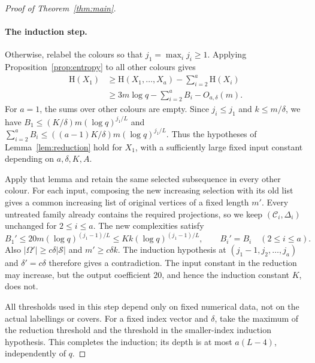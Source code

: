 \documentclass[11pt,a4paper]{article}
\numberwithin{equation}{section}
\newcommand{\HH}{\mathrm H}
\newcommand{\cC}{\mathcal C}
\newcommand{\cS}{\mathcal S}
\begin{document}
\begin{proof}[Proof of Theorem~\ref{thm:main}]
\paragraph{The induction step.}
Otherwise, relabel the colours so that
$j_1=\max_i j_i\ge1$.
Applying Proposition~\ref{prop:entropy} to all other colours
gives
\begin{equation}\label{eq:marginal}
 \begin{aligned}
 \HH(X_1)
 &\ge\HH(X_1,\ldots,X_a)-\sum_{i=2}^a\HH(X_i)\\
 &\ge3m\log q-\sum_{i=2}^aB_i-O_{a,\delta}(m).
 \end{aligned}
\end{equation}
For $a=1$, the sums over other colours are empty.
Since $j_i\le j_1$ and $k\le m/\delta$, we have
$B_1\le(K/\delta)m(\log q)^{j_1/L}$ and
$\sum_{i=2}^aB_i\le((a-1)K/\delta)m(\log q)^{j_1/L}$.
Thus the hypotheses of Lemma~\ref{lem:reduction} hold for
$X_1$, with a sufficiently large fixed input constant depending
on $a,\delta,K,A$.

Apply that lemma and retain the same selected subsequence in
every other colour.
For each input, composing the new increasing selection with
its old list gives a common increasing list of original
vertices of a fixed length $m'$.
Every untreated family already contains the required projections,
so we keep $(\cC_i,\Delta_i)$ unchanged for $2\le i\le a$.
The new complexities satisfy
\begin{equation}\label{eq:descent}
 B_1'\le20m(\log q)^{(j_1-1)/L}
       \le Kk(\log q)^{(j_1-1)/L},\qquad
 B_i'=B_i\quad(2\le i\le a).
\end{equation}
Also $|\Omega'|\ge c\delta|\cS|$ and $m'\ge c\delta k$.
The induction hypothesis at
$(j_1-1,j_2,\ldots,j_a)$ and $\delta'=c\delta$
therefore gives a contradiction.
The input constant in the reduction may increase, but the
output coefficient $20$, and hence the induction constant $K$,
does not.

All thresholds used in this step depend only on fixed numerical
data, not on the actual labellings or covers.
For a fixed index vector and $\delta$, take the maximum of the
reduction threshold and the threshold in the smaller-index
induction hypothesis.
This completes the induction; its depth is at most $a(L-4)$,
independently of $q$.


\end{proof}
\end{document}
